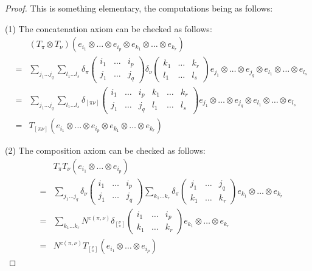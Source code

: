 \documentclass[12pt]{amsbook}
\begin{document}
\begin{proof}
This is something elementary, the computations being as follows:

\medskip

(1) The concatenation axiom can be checked as follows:
\begin{eqnarray*}
&&(T_\pi\otimes T_\nu)(e_{i_1}\otimes\ldots\otimes e_{i_p}\otimes e_{k_1}\otimes\ldots\otimes e_{k_r})\\
&=&\sum_{j_1\ldots j_q}\sum_{l_1\ldots l_s}\delta_\pi\begin{pmatrix}i_1&\ldots&i_p\\j_1&\ldots&j_q\end{pmatrix}\delta_\nu\begin{pmatrix}k_1&\ldots&k_r\\l_1&\ldots&l_s\end{pmatrix}e_{j_1}\otimes\ldots\otimes e_{j_q}\otimes e_{l_1}\otimes\ldots\otimes e_{l_s}\\
&=&\sum_{j_1\ldots j_q}\sum_{l_1\ldots l_s}\delta_{[\pi\nu]}\begin{pmatrix}i_1&\ldots&i_p&k_1&\ldots&k_r\\j_1&\ldots&j_q&l_1&\ldots&l_s\end{pmatrix}e_{j_1}\otimes\ldots\otimes e_{j_q}\otimes e_{l_1}\otimes\ldots\otimes e_{l_s}\\
&=&T_{[\pi\nu]}(e_{i_1}\otimes\ldots\otimes e_{i_p}\otimes e_{k_1}\otimes\ldots\otimes e_{k_r})
\end{eqnarray*}

(2) The composition axiom can be checked as follows:
\begin{eqnarray*}
&&T_\pi T_\nu(e_{i_1}\otimes\ldots\otimes e_{i_p})\\
&=&\sum_{j_1\ldots j_q}\delta_\nu\begin{pmatrix}i_1&\ldots&i_p\\j_1&\ldots&j_q\end{pmatrix}
\sum_{k_1\ldots k_r}\delta_\pi\begin{pmatrix}j_1&\ldots&j_q\\k_1&\ldots&k_r\end{pmatrix}e_{k_1}\otimes\ldots\otimes e_{k_r}\\
&=&\sum_{k_1\ldots k_r}N^{c(\pi,\nu)}\delta_{[^\nu_\pi]}\begin{pmatrix}i_1&\ldots&i_p\\k_1&\ldots&k_r\end{pmatrix}e_{k_1}\otimes\ldots\otimes e_{k_r}\\
&=&N^{c(\pi,\nu)}T_{[^\nu_\pi]}(e_{i_1}\otimes\ldots\otimes e_{i_p})
\end{eqnarray*}


\end{proof}
\end{document}
